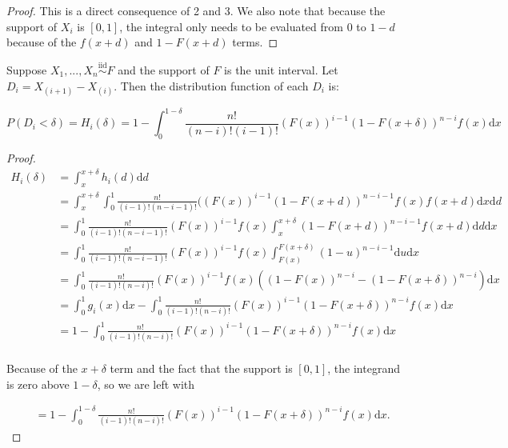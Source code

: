 \documentclass[12pt]{article}
\begin{document}
\begin{proof}
This is a direct consequence of 2 and 3. 
We also note that because the support of $X_i$ is $[0, 1]$, 
the integral only needs to be evaluated from $0$ to $1 - d$ 
because of the $f(x+d)$ and $1 - F(x+d)$ terms.
\end{proof}

\begin{lemma}
Suppose $X_1, ..., X_n \stackrel{\mathrm{iid}}{\sim}F$ and the support of $F$ is the unit interval. 
Let $D_i = X_{(i+1)} - X_{(i)}$. 
Then the distribution function of each $D_i$ is:

\begin{equation}
\label{eq:cdf}
P(D_i < \delta) = H_i(\delta) = 1 - \int_0^{1-\delta} \frac{n!}{(n-i)! (i-1)!} (F(x))^{i-1} (1 - F(x + \delta))^{n-i} f(x) \mathrm{d}x
\end{equation}
\end{lemma}

\begin{proof}
$$
\begin{aligned}
H_i(\delta) & = \int_x^{x+\delta} h_i(d) \mathrm{d}d \\
& = \int_x^{x+\delta} \int_0^{1} \frac{n!}{(i-1)! (n-i-1)!} ((F(x))^{i-1} (1 - F(x+d))^{n-i-1} f(x) f(x+d) \mathrm{d}x \mathrm{d}d \\
& = \int_0^{1} \frac{n!}{(i-1)! (n-i-1)!} (F(x))^{i-1} f(x) \int_x^{x+\delta} (1 - F(x+d))^{n-i-1} f(x+d) \mathrm{d}d \mathrm{d}x \\
& = \int_0^{1} \frac{n!}{(i-1)! (n-i-1)!} (F(x))^{i-1} f(x) \int_{F(x)}^{F(x+\delta)} (1 - u)^{n-i-1} \mathrm{d}u \mathrm{d}x \\
& = \int_0^{1} \frac{n!}{(i-1)! (n-i)!} (F(x))^{i-1} f(x) ((1 - F(x))^{n-i} - (1 - F(x + \delta))^{n-i}) \mathrm{d}x \\ 
& = \int_0^1 g_i(x) \mathrm{d}x - \int_0^1 \frac{n!}{(i-1)! (n-i)!} (F(x))^{i-1} (1 - F(x + \delta))^{n-i} f(x) \mathrm{d}x \\
& = 1 - \int_0^1 \frac{n!}{(i-1)! (n-i)!} (F(x))^{i-1} (1 - F(x + \delta))^{n-i} f(x) \mathrm{d}x \\
\end{aligned}
$$

Because of the $x + \delta$ term and the fact that the support is $[0, 1]$, the integrand is zero above $1 - \delta$, so we are left with 

$$
\begin{aligned}
& = 1 - \int_0^{1 - \delta} \frac{n!}{(i-1)! (n-i)!} (F(x))^{i-1} (1 - F(x + \delta))^{n-i} f(x) \mathrm{d}x.
\end{aligned}
$$
\end{proof}
\end{document}
